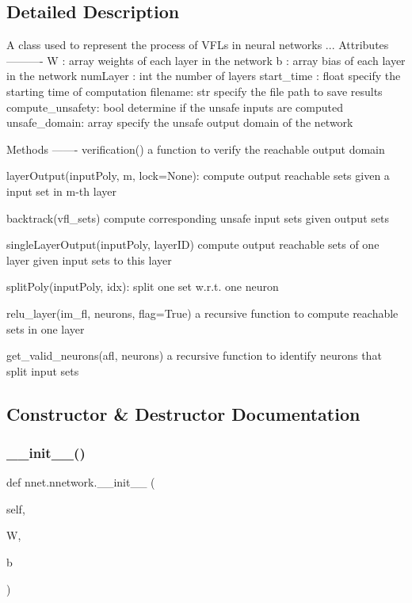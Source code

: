 \subsection{Detailed Description}
\begin{DoxyVerb}    A class used to represent the process of VFLs in neural networks
    ...
    Attributes
    ----------
    W : array
        weights of each layer in the network
    b : array
        bias of each layer in the network
    numLayer : int
        the number of layers
    start_time : float
        specify the starting time of computation
    filename: str
        specify the file path to save results
    compute_unsafety: bool
        determine if the unsafe inputs are computed
    unsafe_domain: array
        specify the unsafe output domain of the network

    Methods
    -------
    verification()
        a function to verify the reachable output domain

    layerOutput(inputPoly, m, lock=None):
        compute output reachable sets given a input set in m-th layer

    backtrack(vfl_sets)
        compute corresponding unsafe input sets given output sets

    singleLayerOutput(inputPoly, layerID)
        compute output reachable sets of one layer given input sets to this layer

    splitPoly(inputPoly, idx):
        split one set w.r.t. one neuron

    relu_layer(im_fl, neurons, flag=True)
        a recursive function to compute reachable sets in one layer

    get_valid_neurons(afl, neurons)
        a recursive function to identify neurons that split input sets\end{DoxyVerb}
 

\subsection{Constructor \& Destructor Documentation}
\mbox{\label{classnnet_1_1nnetwork_ae3c3989cf684b36b9487b5127f09f35c}} 
\subsubsection{\texorpdfstring{\+\_\+\+\_\+init\+\_\+\+\_\+()}{\_\_init\_\_()}}
{\footnotesize\ttfamily def nnet.\+nnetwork.\+\_\+\+\_\+init\+\_\+\+\_\+ (\begin{DoxyParamCaption}\item[{}]{self,  }\item[{}]{W,  }\item[{}]{b }\end{DoxyParamCaption})}

